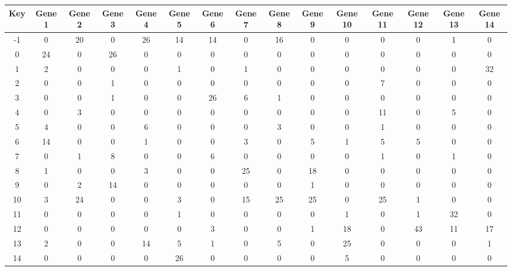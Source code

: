 \begin{tabular}{|c|c|c|c|c|c|c|c|c|c|c|c|c|c|c|}
\hline
Key & Gene 1 & Gene 2 & Gene 3 & Gene 4 & Gene 5 & Gene 6 & Gene 7 & Gene 8 & Gene 9 & Gene 10 & Gene 11 & Gene 12 & Gene 13 & Gene 14 \\
\hline
-1 & 0 & 20 & 0 & 26 & 14 & 14 & 0 & 16 & 0 & 0 & 0 & 0 & 1 & 0 \\
0 & 24 & 0 & 26 & 0 & 0 & 0 & 0 & 0 & 0 & 0 & 0 & 0 & 0 & 0 \\
1 & 2 & 0 & 0 & 0 & 1 & 0 & 1 & 0 & 0 & 0 & 0 & 0 & 0 & 32 \\
2 & 0 & 0 & 1 & 0 & 0 & 0 & 0 & 0 & 0 & 0 & 7 & 0 & 0 & 0 \\
3 & 0 & 0 & 1 & 0 & 0 & 26 & 6 & 1 & 0 & 0 & 0 & 0 & 0 & 0 \\
4 & 0 & 3 & 0 & 0 & 0 & 0 & 0 & 0 & 0 & 0 & 11 & 0 & 5 & 0 \\
5 & 4 & 0 & 0 & 6 & 0 & 0 & 0 & 3 & 0 & 0 & 1 & 0 & 0 & 0 \\
6 & 14 & 0 & 0 & 1 & 0 & 0 & 3 & 0 & 5 & 1 & 5 & 5 & 0 & 0 \\
7 & 0 & 1 & 8 & 0 & 0 & 6 & 0 & 0 & 0 & 0 & 1 & 0 & 1 & 0 \\
8 & 1 & 0 & 0 & 3 & 0 & 0 & 25 & 0 & 18 & 0 & 0 & 0 & 0 & 0 \\
9 & 0 & 2 & 14 & 0 & 0 & 0 & 0 & 0 & 1 & 0 & 0 & 0 & 0 & 0 \\
10 & 3 & 24 & 0 & 0 & 3 & 0 & 15 & 25 & 25 & 0 & 25 & 1 & 0 & 0 \\
11 & 0 & 0 & 0 & 0 & 1 & 0 & 0 & 0 & 0 & 1 & 0 & 1 & 32 & 0 \\
12 & 0 & 0 & 0 & 0 & 0 & 3 & 0 & 0 & 1 & 18 & 0 & 43 & 11 & 17 \\
13 & 2 & 0 & 0 & 14 & 5 & 1 & 0 & 5 & 0 & 25 & 0 & 0 & 0 & 1 \\
14 & 0 & 0 & 0 & 0 & 26 & 0 & 0 & 0 & 0 & 5 & 0 & 0 & 0 & 0 \\
\hline
\end{tabular}